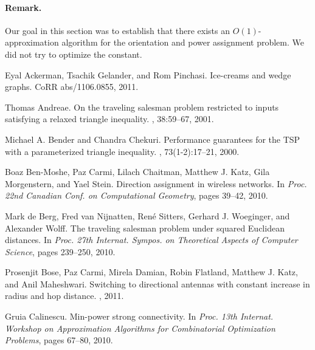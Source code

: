 \documentclass[11pt,letter]{article}
\begin{document}
\paragraph{Remark.}
Our goal in this section was to establish that there exists an $O(1)$-approximation algorithm for the orientation and power assignment problem. We did not try to optimize the constant.













\begin{thebibliography}{1}

Eyal Ackerman, Tsachik Gelander, and Rom Pinchasi.
\newblock Ice-creams and wedge graphs.
\newblock CoRR abs/1106.0855, 2011.

Thomas Andreae.
\newblock On the traveling salesman problem restricted to inputs satisfying a relaxed triangle inequality.
, 38:59--67, 2001.

Michael A. Bender and Chandra Chekuri.
\newblock Performance guarantees for the TSP with a parameterized triangle inequality.
, 73(1-2):17--21, 2000.

Boaz Ben-Moshe, Paz Carmi, Lilach Chaitman, Matthew J. Katz, Gila Morgenstern, and Yael Stein.
\newblock Direction assignment in wireless networks.
\newblock In {\em Proc. 22nd Canadian Conf. on Computational Geometry}, pages 39--42, 2010.

Mark de Berg, Fred van Nijnatten, Ren{\'e} Sitters, Gerhard J. Woeginger, and Alexander Wolff.
\newblock The traveling salesman problem under squared Euclidean distances.
\newblock In {\em Proc. 27th Internat. Sympos. on Theoretical Aspects of Computer Science}, pages 239--250, 2010.



Prosenjit Bose, Paz Carmi, Mirela Damian, Robin Flatland, Matthew J. Katz, and Anil Maheshwari.
\newblock Switching to directional antennas with constant increase in radius and hop distance.
, 2011.





Gruia Calinescu.
\newblock Min-power strong connectivity.
\newblock In {\em Proc. 13th Internat. Workshop on Approximation Algorithms for Combinatorial Optimization Problems},
pages 67--80, 2010.


\end{thebibliography}
\end{document}
